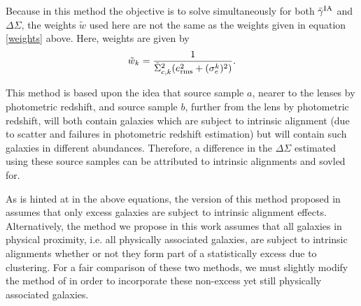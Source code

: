 \documentclass[a4paper,fleqn,usenatbib,useAMS]{mnras}
\begin{document}
Because in this method the objective is to solve simultaneously for both $\bar{\gamma}^{\rm IA}$ and $\Delta \Sigma$, the weights $\tilde{w}$ used here are not the same as the weights given in equation \ref{weights} above. Here, weights are given by
\begin{equation}
\tilde{w}_k = \frac{1}{\tilde{\Sigma}_{c,k}^2 (e_{\rm rms}^2 + (\sigma_e^k)^2)}.
\label{weights_Blazek}
\end{equation}

This method is based upon the idea that source sample $a$, nearer to the lenses by photometric redshift, and source sample $b$, further from the lens by photometric redshift, will both contain galaxies which are subject to intrinsic alignment (due to scatter and failures in photometric redshift estimation) but will contain such galaxies in different abundances. Therefore, a difference in the $\Delta \Sigma$ estimated using these source samples can be attributed to intrinsic alignments and sovled for.

As is hinted at in the above equations, the version of this method proposed in \cite{Blazek2012} assumes that only excess galaxies are subject to intrinsic alignment effects. Alternatively, the method we propose in this work assumes that all galaxies in physical proximity, i.e. all physically associated galaxies, are subject to intrinsic alignments whether or not they form part of a statistically excess due to clustering. For a fair comparison of these two methods, we must slightly modify the method of \cite{Blazek2012} in order to incorporate these non-excess yet still physically associated galaxies.
\end{document}
